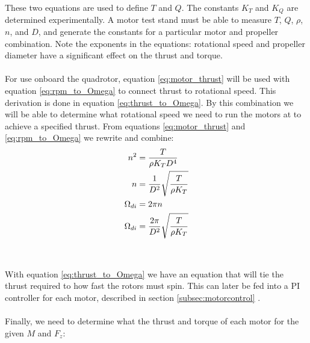 \documentclass{article}
\numberwithin{equation}{section} %
\begin{document}
These two equations are used to define $T$ and $Q$. The constants $K_T$ and $K_Q$ are determined experimentally. A motor test stand must be able to measure $T$, $Q$, $\rho$, $n$, and $D$, and generate the constants for a particular motor and propeller combination. Note the exponents in the equations: rotational speed and propeller diameter have a significant effect on the thrust and torque.
\\ \\
For use onboard the quadrotor, equation \eqref{eq:motor_thrust} will be used with equation \eqref{eq:rpm_to_Omega} to connect thrust to rotational speed. This derivation is done in equation \eqref{eq:thrust_to_Omega}. By this combination we will be able to determine what rotational speed we need to run the motors at to achieve a specified thrust. From equations \eqref{eq:motor_thrust} and \eqref{eq:rpm_to_Omega} we rewrite and combine:
\begin{align}
	n^2 	&= \frac{T}{\rho K_T D^4} \notag \\
	n		&= \frac{1}{D^2} \sqrt{\frac{T}{\rho K_T}} \notag \\
	\Omega_{di}	&= 2 \pi n \notag \\	
	\Omega_{di}	&= \frac{2 \pi}{D^2} \sqrt{\frac{T}{\rho K_T}} \label{eq:thrust_to_Omega}
\end{align}
\\ \\
With equation \eqref{eq:thrust_to_Omega} we have an equation that will tie the thrust required to how fast the rotors must spin. This can later be fed into a PI controller for each motor, described in section \ref{subsec:motorcontrol} .
\\ \\
Finally, we need to determine what the thrust and torque of each motor for the given $M$ and $F_z$:
\end{document}
